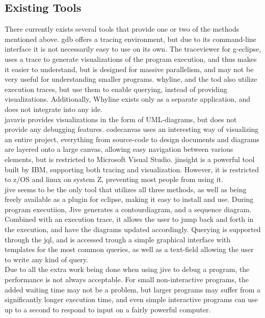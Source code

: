\subsection{Existing Tools}\label{PreTools}
There currently exists several tools that provide one or two of the methods mentioned above.
\Gls{gdb} offers a tracing environment, but due to its command-line interface %
it is not necessarily easy to use on its own.
The \gls{traceviewer}\cite{Kranzlmuller} for g-eclipse, uses a trace to generate visualizations of the program execution, and thus makes it easier to understand, but is  designed for massive parallelism, and may not be very useful for understanding smaller programs.
\Gls{whyline}\cite{ko2009}, and the \gls{tod}\cite{Pothier2007} also utilize execution traces, but use them to enable querying, instead of providing visualizations.
Additionally, Whyline exists only as a separate application, and does not integrate into any \gls{ide}.
~\\

\Gls{javavis}\cite{Oechsle2002} provides visualizations in the form of UML-diagrams, but does not provide any debugging features.
\Gls{codecanvas} uses an interesting way of visualizing an entire project,  everything from source-code to design documents and diagrams  are layered onto a large canvas, allowing easy navigation between various elements, but is restricted to Microsoft Visual Studio.
\Gls{jinsight}\cite{Pauw} is a powerful tool  built by IBM, supporting both tracing and visualization.
However, it is restricted to z/OS and linux on system Z, preventing most people from using it.
~\\

\Gls{jive} seems to be the only tool that utilizes all three methods, as well as being freely available as a plugin for eclipse, making it easy to install and use.
During program executiion, Jive generates a \gls{contourdiagram}\cite{Jayaraman1996}, and a sequence diagram.
Combined with an execution trace, it allows the user to jump back and forth in the  execution, and have the diagrams updated accordingly.
Querying is supported through the \gls{jql}, and is accessed trough a simple graphical interface with templates for the most common queries, as well as a text-field allowing the user to write any kind of query.
~\\

Due to all the extra work being done when using jive to debug a program, the performance is not always acceptable.
For small non-interactive programs, the added waiting time may not be a problem, but larger programs may suffer from a significantly longer execution time, and even simple interactive programs can use up to a second to respond to input on a fairly powerful computer.
~\\





